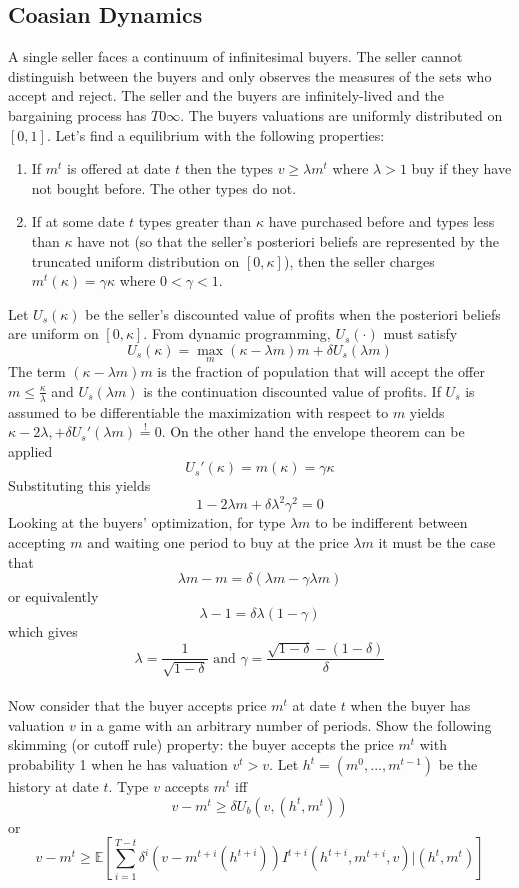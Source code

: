 \documentclass[a4paper, 12pt]{article}
\theoremstyle{plain}
\theoremstyle{definition}
\theoremstyle{lemma}
\theoremstyle{remark}
\theoremstyle{corollary}
\theoremstyle{example}
\begin{document}
	\subsection{Coasian Dynamics}
	A single seller faces a continuum of infinitesimal buyers. The seller cannot distinguish between the buyers and only observes the measures of the sets who accept and reject. The seller and the buyers are infinitely-lived and the bargaining process has $T 0 \infty$. The buyers valuations are uniformly distributed on $[0,1]$. Let's find a equilibrium with the following properties: \begin{enumerate}
		\item If $m^t$ is offered at date $t$ then the types $v \geq \lambda m^t$ where $\lambda > 1$ buy if they have not bought before. The other types do not.
		\item If at some date $t$ types greater than $\kappa$ have purchased before and types less than $\kappa$ have not (so that the seller's posteriori beliefs are represented by the truncated uniform distribution on $[0,\kappa]$), then the seller charges $m^t(\kappa) = \gamma \kappa$ where $0<\gamma <1$.
	\end{enumerate}
	Let $U_s(\kappa)$ be the seller's discounted value of profits when the posteriori beliefs are uniform on $[0,\kappa]$. From dynamic programming, $U_s(\cdot)$ must satisfy \[U_s(\kappa) = \max_m(\kappa - \lambda m)m + \delta U_s(\lambda m)\]
	The term $(\kappa - \lambda m)m$ is the fraction of population that will accept the offer $m \leq \frac{\kappa}{\lambda}$ and $U_s(\lambda m)$ is the continuation discounted value of profits. If $U_s$ is assumed to be differentiable the maximization with respect to $m$ yields $\kappa - 2 \lambda , + \delta U_s'(\lambda m) \overset{!}{=} 0$. On the other hand the envelope theorem can be applied \[U_s'(\kappa) = m(\kappa) = \gamma \kappa\] Substituting this yields \[1-2\lambda m + \delta \lambda^2 \gamma^2 = 0\]
	Looking at the buyers' optimization, for type $\lambda m$ to be indifferent between accepting $m$ and waiting one period to buy at the price $\lambda m$ it must be the case that \[\lambda m - m = \delta (\lambda m - \gamma \lambda m)\] or equivalently \[\lambda -1 = \delta \lambda (1-\gamma)\] which gives \[\lambda = \frac{1}{\sqrt{1-\delta}} \text{ and } \gamma = \frac{\sqrt{1-\delta} - (1-\delta)}{\delta}\]\\
	Now consider that the buyer accepts price $m^t$ at date $t$ when the buyer has valuation $v$ in a game with an arbitrary number of periods. Show the following skimming (or cutoff rule) property: the buyer accepts the price $m^t$ with probability 1 when he has valuation $v^t>v$. Let $h^t = (m^0,..., m^{t-1})$ be the history at date $t$. Type $v$ accepts $m^t$ iff \[v-m^t \geq \delta U_b(v,(h^t,m^t))\] or \[v-m^t \geq \mathbb{E}\left[\sum_{i=1}^{T-t} \delta^i(v-m^{t+i}(h^{t+i})) I^{t+i}(h^{t+i},m^{t+i},v) | (h^t,m^t)\right]\]
\end{document}
